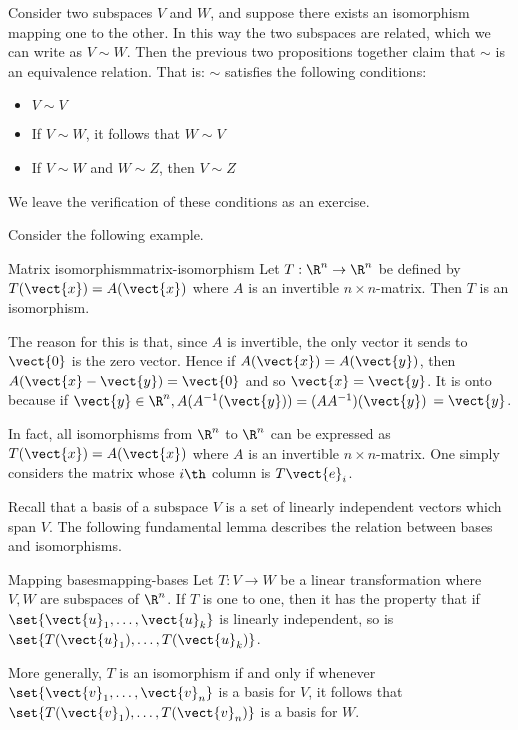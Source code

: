 Consider two subspaces $V$ and $W$, and suppose there exists an isomorphism mapping one to the other. In this way the two subspaces are related, which we can write as $V \sim W$. Then the previous two propositions together claim that $\sim $ is an equivalence relation. That is: $\sim $
satisfies the following conditions:

\begin{itemize}
\item $V\sim V$

\item If $V\sim W$, it follows that $W\sim V$

\item If $V\sim W$ and $W\sim Z$, then $V\sim Z$
\end{itemize}

We leave the verification of these conditions as an exercise.

Consider the following example. 

\begin{example}{Matrix isomorphism}{matrix-isomorphism}
Let $T:\R^{n}\rightarrow \R^{n}$ be defined by $T(\vect{x}) = A(\vect{x})$ where $A$ is an invertible $n\times n$-matrix. Then $T$ is
an isomorphism.
\end{example}

\begin{solution}
The reason for this is that, since $A$ is invertible, the only vector it
sends to $\vect{0}$ is the zero vector. Hence if $A(\vect{x})=A(\vect{y})$, then $A(\vect{x}-\vect{y}) =\vect{0}$ and so $\vect{x}=\vect{y}$. It is onto
because if $\vect{y}\in \R^{n},A(A^{-1} (\vect{y})) =(
AA^{-1}) (\vect{y})$ $=\vect{y}$. 
\end{solution}

In fact, all isomorphisms from $\R^{n}$ to $\R^{n}$ can be expressed as $T(\vect{x}) = A(\vect{x})$ where $A$ is an invertible $n \times n$-matrix. One
simply considers the matrix whose $i\th$ column is $T\vect{e}_{i}$.

Recall that a basis of a subspace $V$ is a set of linearly independent vectors which span $V$. The following fundamental lemma describes the relation between bases and
isomorphisms.

\begin{lemma}{Mapping bases}{mapping-bases}
Let $T:V\rightarrow W$ be a linear transformation where $V,W$ are
subspaces of $\R^n$. If $T$ is one to one, then it has the property that if $\set{\vect{u}_{1},\ldots,\vect{u}_{k}} $ is linearly independent, so is $\set{T(\vect{u}_{1}),\ldots,T(\vect{u}_{k})}$.

More generally, $T$ is an isomorphism if and only if whenever $\set{
\vect{v}_{1},\ldots,\vect{v}_{n}} $ is a basis for $V$, it follows that $\set{T
(\vect{v}_{1}),\ldots,T(\vect{v}_{n})} $ is a basis for $W$. 
\end{lemma}

